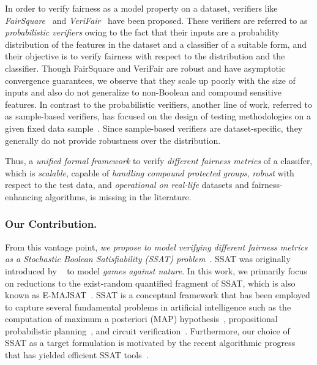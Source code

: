 In order to verify fairness as a model property on a dataset, verifiers like \textit{FairSquare}~\cite{albarghouthi2017fairsquare} and \textit{VeriFair}~\cite{bastani2019probabilistic} have been proposed. 
These verifiers are referred to as {\em probabilistic verifiers} owing to the fact that their inputs are a probability  distribution of the features in the dataset and a classifier of a suitable form, and their objective is to verify fairness with respect to the distribution and the classifier.
Though FairSquare and VeriFair are robust and have asymptotic convergence guarantees, we observe that they scale up poorly with the size of inputs and also do not generalize to non-Boolean and compound sensitive features.
In contrast to the probabilistic verifiers, another line of work, referred to as sample-based verifiers, has focused on the design of testing methodologies  on a given fixed data sample~\cite{galhotra2017fairness,aif360-oct-2018}. 
Since sample-based verifiers are dataset-specific, they generally do not provide robustness over the distribution.


Thus, a \textit{unified formal framework} to verify \textit{different fairness metrics} of a classifer, which is \textit{scalable}, capable of \textit{handling compound protected groups}, \textit{robust} with respect to the test data, and \textit{operational on real-life} datasets and fairness-enhancing algorithms, is missing in the literature.

\subsubsection{Our Contribution.} From this vantage point, \textit{we propose to model verifying different fairness metrics as a Stochastic Boolean Satisfiability (SSAT) problem}~\cite{littman2001stochastic}. SSAT was originally introduced by ~\cite{papadimitriou1985games} to model {\em games against nature}. In this work, we primarily focus on reductions to the exist-random quantified fragment of SSAT, which is also known as E-MAJSAT~\cite{littman2001stochastic}.   SSAT is a conceptual framework that has been employed to capture several fundamental problems in artificial intelligence such as the computation of maximum a posteriori (MAP) hypothesis~\cite{fremont2017maximum},  propositional probabilistic planning~\cite{majercik2007appssat},  and circuit verification~\cite{lee2018towards}. Furthermore, our choice of SSAT as a target formulation is motivated by the recent algorithmic progress that has yielded efficient SSAT tools~\cite{lee2017solving,lee2018solving}.



